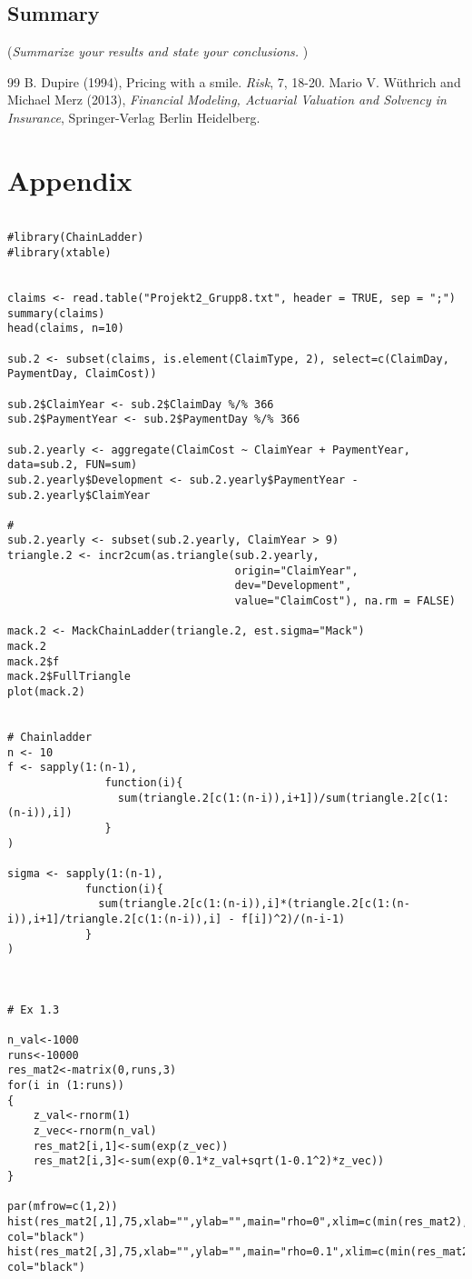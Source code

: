 \documentclass[11pt]{article}
\begin{document}
\subsection*{Summary}
({\it Summarize your results and state your conclusions. })



\begin{thebibliography}{99}
B. Dupire (1994),
Pricing with a smile.
\emph{Risk}, 7, 18-20.
  Mario V. W\"{u}thrich and Michael Merz (2013),
  \emph{Financial Modeling, Actuarial Valuation and Solvency in Insurance},
  Springer-Verlag Berlin Heidelberg.
\end{thebibliography}


\section*{Appendix}

\begin{verbatim}

#library(ChainLadder)
#library(xtable)


claims <- read.table("Projekt2_Grupp8.txt", header = TRUE, sep = ";")
summary(claims)
head(claims, n=10)

sub.2 <- subset(claims, is.element(ClaimType, 2), select=c(ClaimDay, PaymentDay, ClaimCost))

sub.2$ClaimYear <- sub.2$ClaimDay %/% 366
sub.2$PaymentYear <- sub.2$PaymentDay %/% 366

sub.2.yearly <- aggregate(ClaimCost ~ ClaimYear + PaymentYear, data=sub.2, FUN=sum)
sub.2.yearly$Development <- sub.2.yearly$PaymentYear - sub.2.yearly$ClaimYear

#
sub.2.yearly <- subset(sub.2.yearly, ClaimYear > 9)
triangle.2 <- incr2cum(as.triangle(sub.2.yearly,
                                   origin="ClaimYear",
                                   dev="Development",
                                   value="ClaimCost"), na.rm = FALSE)

mack.2 <- MackChainLadder(triangle.2, est.sigma="Mack")
mack.2
mack.2$f
mack.2$FullTriangle
plot(mack.2)


# Chainladder
n <- 10
f <- sapply(1:(n-1),
               function(i){
                 sum(triangle.2[c(1:(n-i)),i+1])/sum(triangle.2[c(1:(n-i)),i])
               }
)

sigma <- sapply(1:(n-1),
            function(i){
              sum(triangle.2[c(1:(n-i)),i]*(triangle.2[c(1:(n-i)),i+1]/triangle.2[c(1:(n-i)),i] - f[i])^2)/(n-i-1)
            }
)



# Ex 1.3

n_val<-1000
runs<-10000
res_mat2<-matrix(0,runs,3)
for(i in (1:runs))
{
	z_val<-rnorm(1)
	z_vec<-rnorm(n_val)
	res_mat2[i,1]<-sum(exp(z_vec))
	res_mat2[i,3]<-sum(exp(0.1*z_val+sqrt(1-0.1^2)*z_vec))
}

par(mfrow=c(1,2))
hist(res_mat2[,1],75,xlab="",ylab="",main="rho=0",xlim=c(min(res_mat2),max(res_mat2)),
col="black")
hist(res_mat2[,3],75,xlab="",ylab="",main="rho=0.1",xlim=c(min(res_mat2),max(res_mat2)),
col="black")
\end{verbatim}
\end{document}
